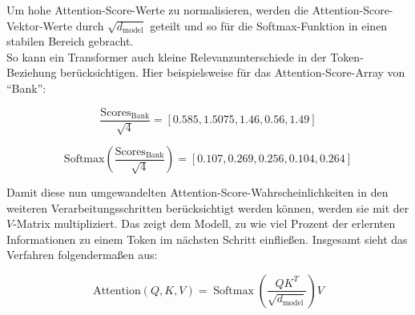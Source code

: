 Um hohe Attention-Score-Werte zu normalisieren, werden die Attention-Score-Vektor-Werte durch \( \sqrt{d_{\text{model}}} \) geteilt und so für die Softmax-Funktion in einen stabilen Bereich gebracht. \\
So kann ein Transformer auch kleine Relevanzunterschiede in der Token-Beziehung berücksichtigen.
Hier beispielsweise für das Attention-Score-Array von \enquote{Bank}:

\[
\frac{\text{Scores}_{\text{Bank}}}{\sqrt{4}} = [0.585, 1.5075, 1.46, 0.56, 1.49]
\]

\[
\text{Softmax}\left(\frac{\text{Scores}_{\text{Bank}}}{\sqrt{4}}\right) = [0.107, 0.269, 0.256, 0.104, 0.264]
\]

Damit diese nun umgewandelten Attention-Score-Wahrscheinlichkeiten in den weiteren Verarbeitungsschritten berücksichtigt werden können, werden sie mit der \( V \)-Matrix multipliziert. 
Das zeigt dem Modell, zu wie viel Prozent der erlernten Informationen zu einem Token im nächsten Schritt einfließen.
Insgesamt sieht das Verfahren folgendermaßen aus:

\[
\text{Attention}(Q, K, V) = \operatorname{Softmax}\left(\frac{QK^T}{\sqrt{d_{\text{model}}}}\right) V
\]


